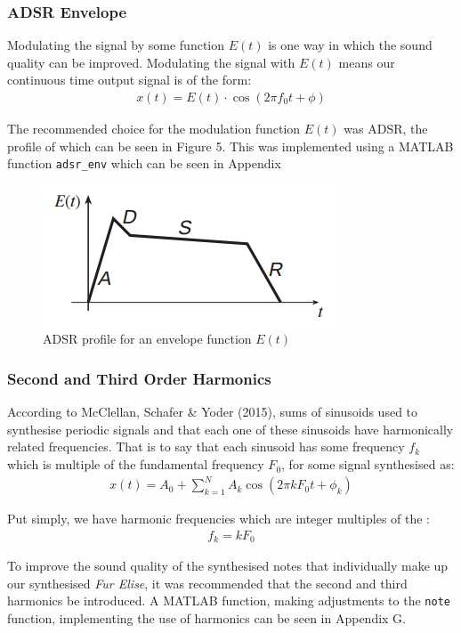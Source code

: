 \documentclass{article}
\begin{document}
\subsubsection{ADSR Envelope}
Modulating the signal by some function $E(t)$ is one way in which the sound quality can be improved. Modulating the signal with $E(t)$ means our continuous time output signal is of the form:
\begin{align}
	x(t) = E(t) \cdot \cos(2 \pi f_0 t + \phi)
\end{align}

The recommended choice for the modulation function $E(t)$ was ADSR, the profile of which can be seen in Figure 5. This was implemented using a MATLAB function \verb|adsr_env| which can be seen in Appendix 

\begin{figure}[H]
	\centering
	\includegraphics[scale=0.7]{adsr.png}
	\caption{ADSR profile for an envelope function $E(t)$}
\end{figure}

\subsubsection{Second and Third Order Harmonics}
According to McClellan, Schafer \& Yoder (2015), sums of sinusoids used to synthesise periodic signals and that each one of these sinusoids have harmonically related frequencies. That is to say that each sinusoid has some frequency $f_k$ which is multiple of the fundamental frequency $F_0$, for some signal synthesised as:
\begin{align}
	x(t) = A_0 + \sum_{k = 1}^{N}A_k \cos(2 \pi k F_0 t + \phi_k)
\end{align}

Put simply, we have harmonic frequencies which are integer multiples of the :
\begin{align}
	f_k = k F_0
\end{align}

To improve the sound quality of the synthesised notes that individually make up our synthesised \textit{Fur Elise}, it was recommended that the second and third harmonics be introduced. A MATLAB function, making adjustments to the \verb|note| function, implementing the use of harmonics can be seen in Appendix G.
\end{document}
